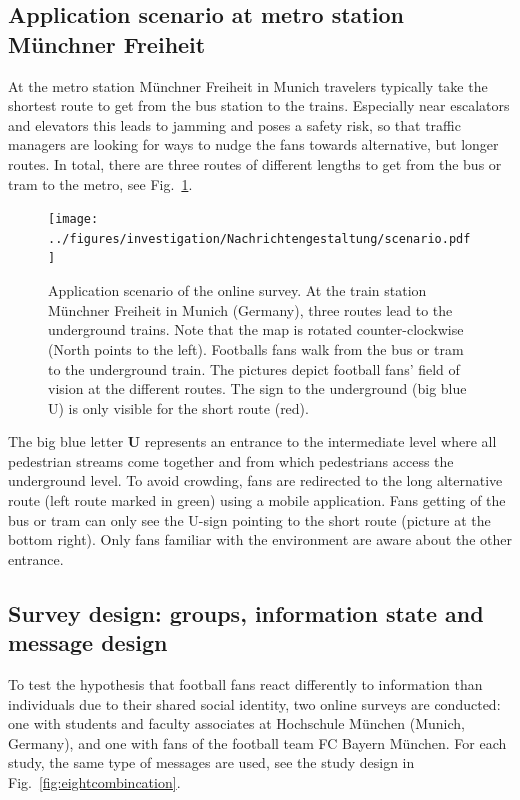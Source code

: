 \subsection{Application scenario at metro station Münchner Freiheit}
\label{sec:applicationscenariodescription}

At the metro station M\"{u}nchner Freiheit in Munich  travelers typically take the shortest route to get from the bus station to the trains. Especially near escalators and elevators this leads to jamming and poses a safety risk, so that traffic managers are looking for ways to nudge the fans towards alternative, but longer routes. 
In total, there are three routes of different lengths to get from the bus or tram to the metro, see Fig.~\ref{fig:mapviewmuc}. 


\begin{figure}[hbt!]
\centering
\texttt{[image: ../figures/investigation/Nachrichtengestaltung/scenario.pdf]} 
\caption[Application scenario of the online survey]{Application scenario of the online survey. At the train station Münchner Freiheit in Munich (Germany), three routes lead to the underground trains. Note that the map is rotated counter-clockwise (North points to the left). Footballs fans walk from the bus or tram to the underground train. The pictures depict football fans' field of vision at the different routes. The sign to the underground (big blue U) is only visible for the short route (red).  }
\label{fig:mapviewmuc}
\end{figure}

The big blue letter \textbf{U} represents an entrance to the intermediate level where all pedestrian streams come together and from which pedestrians access the underground level. To avoid crowding, fans are redirected to the long alternative route (left route marked in green) using a mobile application. Fans getting of the bus or tram can only see the U-sign pointing to the short route (picture at the bottom right). Only fans familiar with the environment are aware about the other entrance.







\subsection{Survey design: groups, information state and message design}

To test the hypothesis that football fans react differently to information than individuals due to their shared social identity, two online surveys are conducted: one with students and faculty associates at Hochschule M\"{u}nchen (Munich, Germany), and one with fans of the football team FC Bayern M\"unchen. 
For each study, the same type of messages are used, see the study design in Fig.~\ref{fig:eightcombincation}.


